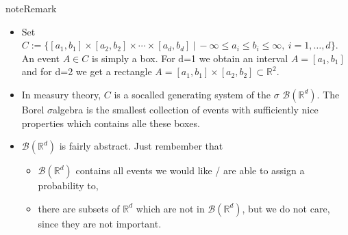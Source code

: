 \documentclass[letterpaper,10pt,english]{jupyterBook}
\begin{document}
\begin{sphinxadmonition}{note}{Remark}
\begin{itemize}
\item {} 
\sphinxAtStartPar
Set \(C := \big\{ [a_1, b_1] \times [a_2, b_2] \times \cdots \times [a_d, b_d]~\big|~-\infty \le a_i \le b_i \le \infty, ~i = 1, \dots, d\big\}\). An event \(A \in C\) is simply a box. For d=1 we obtain an interval \(A = [a_1, b_1]\) and for d=2 we get a rectangle \(A = [a_1, b_1] \times [a_2, b_2] \subset \mathbb{R}^2\).

\item {} 
\sphinxAtStartPar
In measury theory, \(C\) is a so\sphinxhyphen{}called generating system of the  \(\sigma\)\sphinxhyphen{} \(\mathcal{B}(\mathbb{R}^d)\). The Borel \(\sigma\)\sphinxhyphen{}algebra is the smallest collection of events with sufficiently nice properties which contains alle these boxes.

\item {} 
\sphinxAtStartPar
\(\mathcal{B}(\mathbb{R}^d)\) is fairly abstract. Just rembember that
\begin{itemize}
\item {} 
\sphinxAtStartPar
\(\mathcal{B}(\mathbb{R}^d)\) contains all events we would like / are able to assign a probability to,

\item {} 
\sphinxAtStartPar
there are subsets of \(\mathbb{R}^d\) which are not in \(\mathcal{B}(\mathbb{R}^d)\), but we do not care, since they are not important.

\end{itemize}

\end{itemize}
\end{sphinxadmonition}
\end{document}
